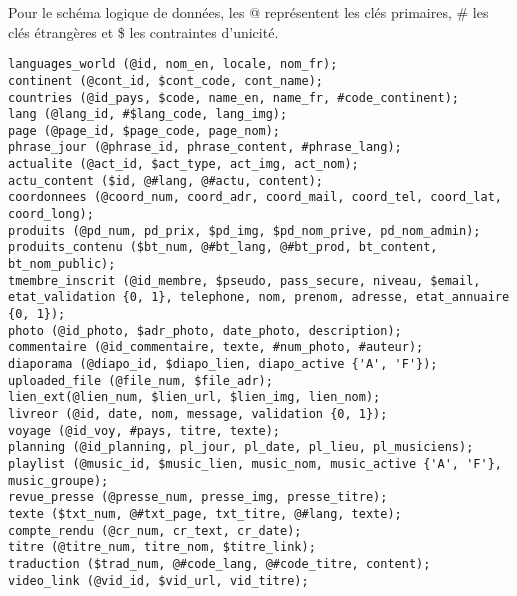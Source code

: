 \par Pour le schéma logique de données, les @ représentent les clés primaires, 
\# les clés étrangères et \$ les contraintes d'unicité. \\
\begin{verbatim}
languages_world (@id, nom_en, locale, nom_fr);
continent (@cont_id, $cont_code, cont_name);
countries (@id_pays, $code, name_en, name_fr, #code_continent);
lang (@lang_id, #$lang_code, lang_img);
page (@page_id, $page_code, page_nom);
phrase_jour (@phrase_id, phrase_content, #phrase_lang);
actualite (@act_id, $act_type, act_img, act_nom);
actu_content ($id, @#lang, @#actu, content);
coordonnees (@coord_num, coord_adr, coord_mail, coord_tel, coord_lat, 
coord_long);
produits (@pd_num, pd_prix, $pd_img, $pd_nom_prive, pd_nom_admin);
produits_contenu ($bt_num, @#bt_lang, @#bt_prod, bt_content, bt_nom_public);
tmembre_inscrit (@id_membre, $pseudo, pass_secure, niveau, $email, 
etat_validation {0, 1}, telephone, nom, prenom, adresse, etat_annuaire {0, 1});
photo (@id_photo, $adr_photo, date_photo, description);
commentaire (@id_commentaire, texte, #num_photo, #auteur);
diaporama (@diapo_id, $diapo_lien, diapo_active {'A', 'F'});
uploaded_file (@file_num, $file_adr);
lien_ext(@lien_num, $lien_url, $lien_img, lien_nom);
livreor (@id, date, nom, message, validation {0, 1});
voyage (@id_voy, #pays, titre, texte);
planning (@id_planning, pl_jour, pl_date, pl_lieu, pl_musiciens);
playlist (@music_id, $music_lien, music_nom, music_active {'A', 'F'}, 
music_groupe);
revue_presse (@presse_num, presse_img, presse_titre);
texte ($txt_num, @#txt_page, txt_titre, @#lang, texte);
compte_rendu (@cr_num, cr_text, cr_date);
titre (@titre_num, titre_nom, $titre_link);
traduction ($trad_num, @#code_lang, @#code_titre, content);
video_link (@vid_id, $vid_url, vid_titre);
\end{verbatim}
